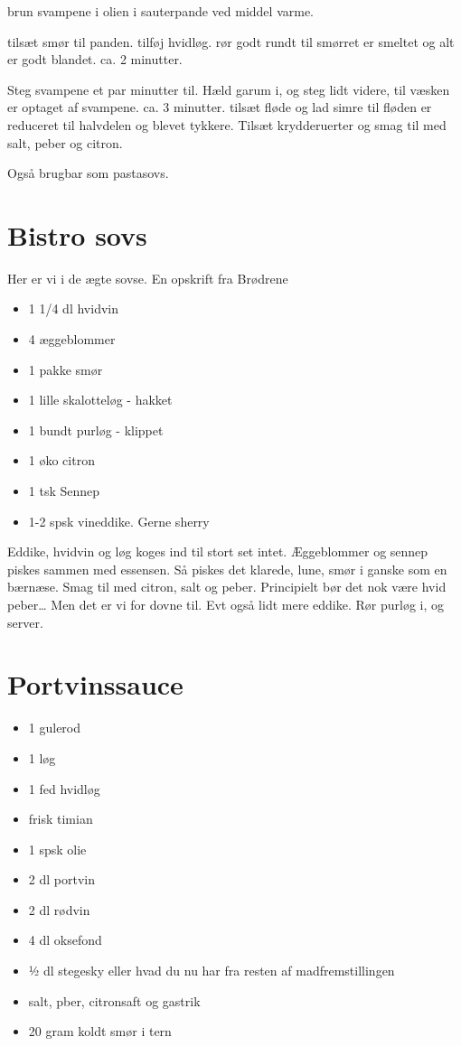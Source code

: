 \documentclass[
]{book}
\providecommand{\tightlist}{%
  \setlength{\itemsep}{0pt}\setlength{\parskip}{0pt}}
\begin{document}
brun svampene i olien i sauterpande ved middel varme.

tilsæt smør til panden. tilføj hvidløg. rør godt rundt til smørret er smeltet og alt er godt
blandet. ca. 2 minutter.

Steg svampene et par minutter til. Hæld garum i, og steg lidt videre, til
væsken er optaget af svampene. ca. 3 minutter.
tilsæt fløde og lad simre til fløden er reduceret til halvdelen og blevet tykkere.
Tilsæt krydderuerter og smag til med salt, peber og citron.

Også brugbar som pastasovs.

\hypertarget{bistro-sovs}{%
\section{Bistro sovs}\label{bistro-sovs}}

Her er vi i de ægte sovse. En opskrift fra Brødrene

\begin{itemize}
\tightlist
\item
  1 1/4 dl hvidvin
\item
  4 æggeblommer
\item
  1 pakke smør
\item
  1 lille skalotteløg - hakket
\item
  1 bundt purløg - klippet
\item
  1 øko citron
\item
  1 tsk Sennep
\item
  1-2 spsk vineddike. Gerne sherry
\end{itemize}

Eddike, hvidvin og løg koges ind til stort set intet.
Æggeblommer og sennep piskes sammen med essensen. Så piskes det klarede,
lune, smør i ganske som en bærnæse. Smag til med citron, salt og peber.
Principielt bør det nok være hvid peber\ldots{} Men det er vi for dovne til.
Evt også lidt mere eddike.
Rør purløg i, og server.

\hypertarget{portvinssauce}{%
\section{Portvinssauce}\label{portvinssauce}}

\begin{itemize}
\tightlist
\item
  1 gulerod
\item
  1 løg
\item
  1 fed hvidløg
\item
  frisk timian
\item
  1 spsk olie
\item
  2 dl portvin
\item
  2 dl rødvin
\item
  4 dl oksefond
\item
  ½ dl stegesky eller hvad du nu har fra resten af madfremstillingen
\item
  salt, pber, citronsaft og gastrik
\item
  20 gram koldt smør i tern
\end{itemize}
\end{document}
